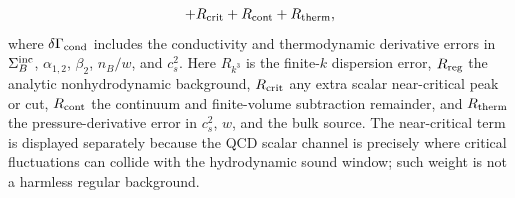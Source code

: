 \begin{controlledapproximation}
\begin{align}
  +R_{\rm crit}
  +R_{\rm cont}
  +R_{\rm therm},
  \label{eq:qcd-bulk-sound-error-budget}
\end{align}
where \(\delta\Gamma_{\rm cond}\) includes the conductivity and thermodynamic
derivative errors in \(\Sigma_B^{\rm inc}\), \(\alpha_{1,2}\), \(\beta_2\),
\(n_B/w\), and \(c_s^2\).  Here \(R_{k^3}\) is the finite-\(k\) dispersion
error, \(R_{\rm reg}\) the analytic nonhydrodynamic background,
\(R_{\rm crit}\) any extra scalar near-critical peak or cut, \(R_{\rm cont}\)
the continuum and finite-volume subtraction remainder, and \(R_{\rm therm}\)
the pressure-derivative error in \(c_s^2\), \(w\), and the bulk source.  The
near-critical term is displayed separately because the QCD scalar channel is
precisely where critical fluctuations can collide with the hydrodynamic sound
window; such weight is not a harmless regular background.
\end{controlledapproximation}

